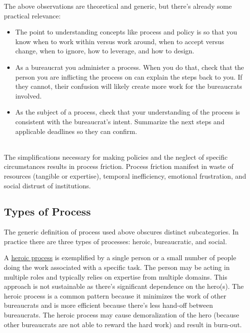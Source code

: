 The above observations are theoretical and generic, but there's already some practical relevance:
\begin{itemize}
    \item The point to understanding concepts like process and policy is so that you know when to work within versus work around, when to accept versus change, when to ignore, how to leverage, and how to design.
    \item As a bureaucrat you administer a process. When you do that, check that the person you are inflicting the process on can explain the steps back to you. If they cannot, their confusion will likely create more work for the bureaucrats involved. 
    \item As the subject of a process, check that your understanding of the process is consistent with the bureaucrat's intent. Summarize the next steps and applicable deadlines so they can confirm. 
\end{itemize}

\ \\

The simplifications necessary for making policies and the neglect of specific circumstances results in \gls{process friction}. Process friction manifest in waste of resources (tangible or expertise), temporal inefficiency, emotional frustration, and social distrust of institutions.



\subsection*{Types of Process}
The generic definition of \gls{process} used above obscures distinct subcategories. In practice there are three types of processes: heroic, bureaucratic, and social.

A \underline{heroic process} is exemplified by a single person or a small number of people doing the work associated with a specific task. The person may be acting in multiple roles and typically relies on expertise from multiple domains. This approach is not sustainable as there's significant dependence on the hero(s). The heroic process is a common pattern because it minimizes the work of other bureaucrats and is more efficient because there's less hand-off between bureaucrats. The heroic process may cause demoralization of the hero (because other bureaucrats are not able to reward the hard work) and result in burn-out. 

